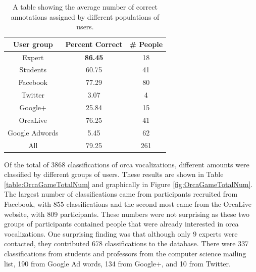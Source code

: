 \documentclass[12pt,oneside]{book}
\begin{document}
\begin{table}
\begin{tabular}{|c|c|c|}
\hline
User group & Percent Correct       & \# People \\
\hline
Expert           &	\textbf{86.45} & 18        \\
Students         &	60.75          & 41        \\
Facebook         &	77.29          & 80        \\
Twitter          &	3.07           & 4         \\
Google+          &	25.84          & 15        \\
OrcaLive         &	76.25          & 41        \\
Google Adwords   &	5.45           & 62        \\
\hline
All              &	79.25          & 261       \\
\hline
\end{tabular}
\caption{A table showing the average number of correct annotations
  assigned by different populations of users.}
\label{table:percentCorrect}
\end{table}

Of the total of 3868 classifications of orca vocalizations, different
amounts were classified by different groups of users.  These results
are shown in Table \ref{table:OrcaGameTotalNum} and graphically in
Figure \ref{fig:OrcaGameTotalNum}.  The largest number of
classifications came from participants recruited from Facebook, with
855 classifications and the second most came from the OrcaLive
website, with 809 participants.  These numbers were not surprising as
these two groups of participants contained people that were already
interested in orca vocalizations.  One surprising finding was that
although only 9 experts were contacted, they contributed 678
classifications to the database.  There were 337 classifications from
students and professors from the computer science mailing list, 190
from Google Ad words, 134 from Google+, and 10 from Twitter.
\end{document}
